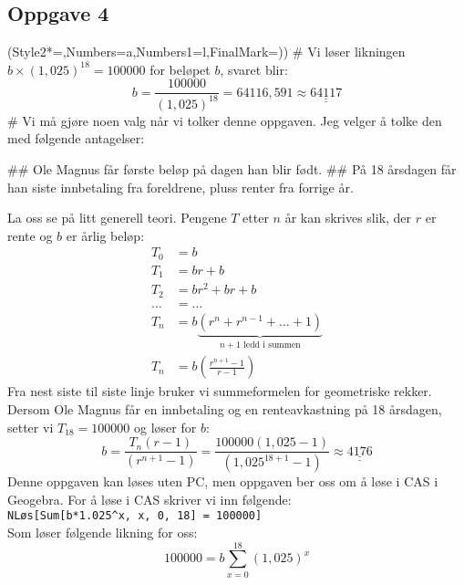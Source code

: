 \documentclass[12pt, a4paper]
{article}						%
\def\answer#1{\underline{\underline{#1}}}
\begin{document}
\subsection*{Oppgave 4}
\begin{easylist}[enumerate]
	\ListProperties(Style2*=,Numbers=a,Numbers1=l,FinalMark={)})
	# Vi løser likningen $b\times (1,025)^{18} = 100000$ for beløpet $b$, svaret blir:
	\begin{equation*}
		b = \frac{100000}{(1,025)^{18}} = 64116,591 \approx \answer{64117}
	\end{equation*}
	# Vi må gjøre noen valg når vi tolker denne oppgaven. Jeg velger å tolke den med følgende antagelser:
	\begin{easylist}
		## Ole Magnus får første beløp på dagen han blir født. 
		## På 18 årsdagen får han siste innbetaling fra foreldrene, pluss renter fra forrige år.
	\end{easylist}
	La oss se på litt generell teori.
	Pengene $T$ etter $n$ år kan skrives slik, der $r$ er rente og $b$ er årlig beløp:
	\begin{align*}
		T_0 &= b \\
		T_1 &= br + b \\
		T_2 &= br^2 + br + b \\
		\ldots &= \ldots \\
		T_n &= b  \underbrace{ \left( r^n + r^{n-1} + \dots + 1 \right)}_{n+1\text{ ledd i summen}}   \\
		T_n &= b  \left( \frac{r^{n+1}-1}{r-1} \right)   
	\end{align*}
	Fra nest siste til siste linje bruker vi summeformelen for geometriske rekker.
	Dersom Ole Magnus får en innbetaling og en renteavkastning på 18 årsdagen, setter vi $T_{18} = 100000$ og løser for $b$:
	\begin{equation*}
		b = \frac{T_{n}\left(r-1\right)}{\left(r^{n+1}-1\right)} = \frac{100000\left(1,025-1\right)}{\left(1,025^{18+1}-1\right)} \approx \answer{4176} 
	\end{equation*}
	Denne oppgaven kan løses uten PC, men oppgaven ber oss om å løse i CAS i Geogebra. For å løse i CAS skriver vi inn følgende: \\
	\texttt{NLøs[Sum[b*1.025\textasciicircum x, x, 0, 18] = 100000]} \\
	Som løser følgende likning for oss:
	\begin{equation*}
		100000 = b \sum_{x=0}^{18} (1,025)^x
	\end{equation*}
	

\end{easylist}
\end{document}
